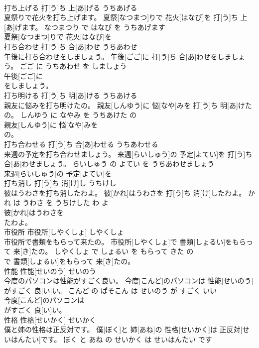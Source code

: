 \documentclass[8pt]{extreport}
\begin{document}
\begin{CJK}{UTF8}{min}
\\	打ち上げる	打[う]ち 上[あ]げる	うちあげる	
\\	夏祭りで花火を打ち上げます。	夏祭[なつまつ]りで 花火[はなび]を 打[う]ち 上[あ]げます。	なつまつり で はなび を うちあげます	
\\	夏祭[なつまつ]りで 花火[はなび]を
\\	打ち合わせ	打[う]ち 合[あ]わせ	うちあわせ	
\\	午後に打ち合わせをしましょう。	午後[ごご]に 打[う]ち 合[あ]わせをしましょう。	ごご に うちあわせ を しましょう	
\\	午後[ごご]に
\\	をしましょう。			
\\	打ち明ける	打[う]ち 明[あ]ける	うちあける	
\\	親友に悩みを打ち明けたの。	親友[しんゆう]に 悩[なや]みを 打[う]ち 明[あ]けたの。	しんゆう に なやみ を うちあけた の	
\\	親友[しんゆう]に 悩[なや]みを
\\	の。			
\\	打ち合わせる	打[う]ち 合[あ]わせる	うちあわせる	
\\	来週の予定を打ち合わせましょう。	来週[らいしゅう]の 予定[よてい]を 打[う]ち 合[あ]わせましょう。	らいしゅう の よてい を うちあわせましょう	
\\	来週[らいしゅう]の 予定[よてい]を
\\	打ち消し	打[う]ち 消[け]し	うちけし	
\\	彼はうわさを打ち消したわよ。	彼[かれ]はうわさを 打[う]ち 消[け]したわよ。	かれ は うわさ を うちけした わ よ	
\\	彼[かれ]はうわさを
\\	たわよ。			
\\	市役所	市役所[しやくしょ]	しやくしょ	
\\	市役所で書類をもらって来たの。	市役所[しやくしょ]で 書類[しょるい]をもらって 来[き]たの。	しやくしょ で しょるい を もらって きた の	
\\	で 書類[しょるい]をもらって 来[き]たの。			
\\	性能	性能[せいのう]	せいのう	
\\	今度のパソコンは性能がすごく良い。	今度[こんど]のパソコンは 性能[せいのう]がすごく 良[い]い。	こんど の ぱそこん は せいのう が すごく いい	
\\	今度[こんど]のパソコンは
\\	がすごく 良[い]い。			
\\	性格	性格[せいかく]	せいかく	
\\	僕と姉の性格は正反対です。	僕[ぼく]と 姉[あね]の 性格[せいかく]は 正反対[せいはんたい]です。	ぼく と あね の せいかく は せいはんたい です	

\end{CJK}
\end{document}
